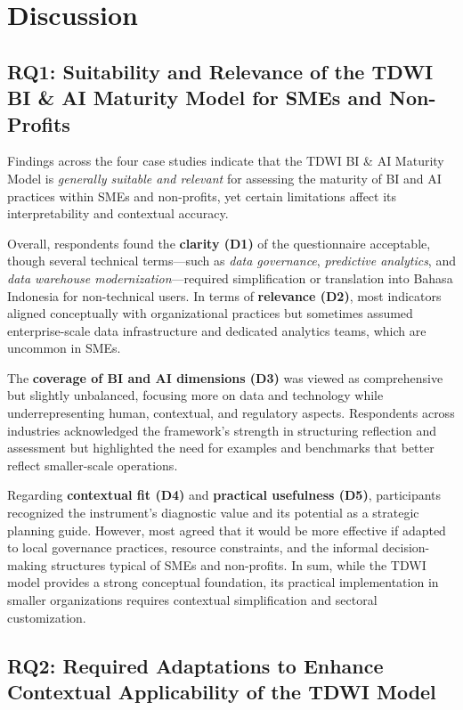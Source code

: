 \documentclass[conference]{IEEEtran}
\begin{document}
\section{Discussion}
\label{sec:discussion}

\subsection{RQ1: Suitability and Relevance of the TDWI BI \& AI Maturity Model for SMEs and Non-Profits}
\label{sec:discussion_rq1}

Findings across the four case studies indicate that the TDWI BI \& AI Maturity Model is \textit{generally suitable and relevant} for assessing the maturity of BI and AI practices within SMEs and non-profits, yet certain limitations affect its interpretability and contextual accuracy. 

Overall, respondents found the \textbf{clarity (D1)} of the questionnaire acceptable, though several technical terms—such as \emph{data governance}, \emph{predictive analytics}, and \emph{data warehouse modernization}—required simplification or translation into Bahasa Indonesia for non-technical users.  
In terms of \textbf{relevance (D2)}, most indicators aligned conceptually with organizational practices but sometimes assumed enterprise-scale data infrastructure and dedicated analytics teams, which are uncommon in SMEs.  

The \textbf{coverage of BI and AI dimensions (D3)} was viewed as comprehensive but slightly unbalanced, focusing more on data and technology while underrepresenting human, contextual, and regulatory aspects. Respondents across industries acknowledged the framework’s strength in structuring reflection and assessment but highlighted the need for examples and benchmarks that better reflect smaller-scale operations.  

Regarding \textbf{contextual fit (D4)} and \textbf{practical usefulness (D5)}, participants recognized the instrument’s diagnostic value and its potential as a strategic planning guide. However, most agreed that it would be more effective if adapted to local governance practices, resource constraints, and the informal decision-making structures typical of SMEs and non-profits.  
In sum, while the TDWI model provides a strong conceptual foundation, its practical implementation in smaller organizations requires contextual simplification and sectoral customization.

\subsection{RQ2: Required Adaptations to Enhance Contextual Applicability of the TDWI Model}
\label{sec:discussion_rq2}
\end{document}

